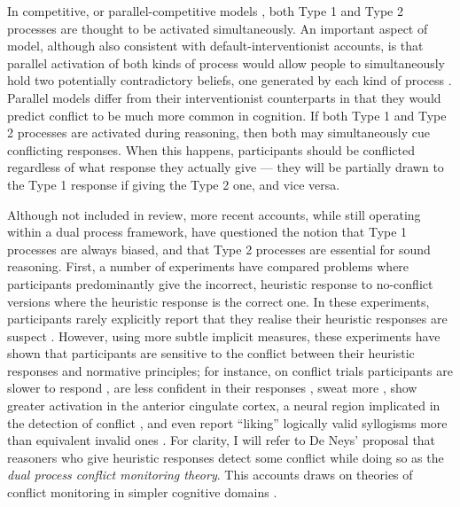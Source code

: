 In competitive, or parallel-competitive models \citep{Sloman1996,Sloman2014a,Sloman2014,Darlow2010,Sloman2002},
both Type 1 and Type 2 processes are thought to be activated simultaneously.
An important aspect of  model,
although also consistent with default-interventionist accounts,
is that parallel activation of both kinds of process would allow
people to simultaneously hold two potentially contradictory beliefs,
one generated by each kind of process \citep[Criterion S;][]{Sloman1996}.
Parallel models differ from their interventionist counterparts
in that they would predict conflict to be much more common in cognition.
If both Type 1 and Type 2 processes are activated during reasoning,
then both may simultaneously cue conflicting responses.
When this happens, participants should be conflicted
regardless of what response they actually give ---
they will be partially drawn to the Type 1 response
if giving the Type 2 one, and vice versa.

Although not included in  review,
more recent accounts,
while still operating within a dual process framework,
have questioned the notion that
Type 1 processes are always biased,
and that Type 2 processes are essential for sound reasoning.
First, a number of experiments
\citep[e.g.][]{DeNeys2008,DeNeys2008a,DeNeys2011b,DeNeys2013a,
  DeNeys2010,DeNeys2008a,Morsanyi2012}
have compared problems where
participants predominantly give the incorrect, heuristic response
to no-conflict versions where
the heuristic response is the correct one.
In these experiments, participants rarely
explicitly report that they realise their heuristic responses
are suspect \citep{DeNeys2008}.
However, using more subtle implicit measures,
these experiments have shown that participants
are sensitive to the conflict between
their heuristic responses and normative principles;
for instance, on conflict trials participants
are slower to respond \citep{DeNeys2008a},
are less confident in their responses \citep{DeNeys2011b, DeNeys2013a},
sweat more \citep{DeNeys2010},
show greater activation in the anterior cingulate cortex,
a neural region implicated in the detection of conflict \citep{DeNeys2008a},
and even report ``liking'' logically valid syllogisms
more than equivalent invalid ones \citep{Morsanyi2012}.
For clarity, I will refer to De Neys' \citep[e.g.][]{DeNeys2008} proposal
that reasoners who give heuristic responses
detect some conflict while doing so
as the \emph{dual process conflict monitoring theory}.
This accounts draws on theories of conflict monitoring
in simpler cognitive domains \citep{Botvinick2001}.

